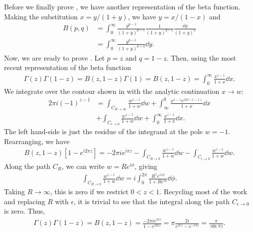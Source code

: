 Before we finally prove , we have another representation of the beta function.
Making the substitution $x = y/(1+y)$, we have $y = x/(1-x)$ and
\begin{align}
    B(p,q) &= \int_{0}^{\infty} \frac{y^{p-1}}{(1+y)^{p-1}} \frac{1}{(1+y)^{q-1}} \frac{\dd{y}}{(1+y)^2} \nonumber \\
           &= \int_{0}^{\infty} \frac{y^{p-1}}{(1+y)^{p+q}} \dd{y}
.\end{align}
Now, we are ready to prove .
Let $p = z$ and $q = 1-z$.
Then, using the most recent representation of the beta function 
\begin{eqnarray}
    \Gamma(z)\Gamma(1-z) = B(z,1-z) \Gamma(1) = B(z,1-z) = \int_{0}^{\infty} \frac{x^{z-1}}{1+x} \dd{x}
.\end{eqnarray}
We integrate over the contour shown in  with the analytic continuation $x \rightarrow w$:
\begin{align}
    \label{eq:beta-contour-integral}
    2 \pi i (-1)^{z-1} &= \int_{C_{R \rightarrow \infty}} \frac{w^{z-1}}{1+w} \dd{w} + \int_{\infty}^{0} \frac{x^{1-z} e^{i 2\pi(z-1)}}{1+x} \dd{x} \nonumber \\
             &+ \int_{C_{\epsilon\rightarrow 0}} \frac{w^{z-1}}{1+w} \dd{w} + \int_{0}^{\infty} \frac{x^{z-1}}{1+x} \dd{x}
.\end{align}
The left hand-side is just the residue of the integrand at the pole $w = -1$.
Rearranging, we have
\begin{align}
    B(z,1-z) [ 1 - e^{i 2 \pi z} ] = -2 \pi i e^{i \pi z} - \int_{C_{R \rightarrow 0}} \frac{w^{z-1}}{1 + w} \dd{w} - \int_{C_{\epsilon \rightarrow 0}} \frac{w^{z-1}}{1 + w} \dd{w}
.\end{align}
Along the path $C_{R}$, we can write $w = R e^{i \phi}$, giving
\begin{eqnarray}
    \int_{C_{R \rightarrow 0}} \frac{w^{z-1}}{1 + w} \dd{w} = i \int_{0}^{2\pi} \frac{R^{z} e^{iz\phi}}{1 + R e^{i\phi}} \dd{\phi}
.\end{eqnarray}
Taking $R \rightarrow \infty$, this is zero if we restrict $0 < z < 1$.
Recycling most of the work and replacing $R$ with $\epsilon$, it is trivial to see that the integral along the path $C_{\epsilon \rightarrow 0}$ is zero.
Thus,
\begin{eqnarray}
    \Gamma(z) \Gamma(1-z) = B(z,1-z) = \frac{-2 \pi i e^{i \pi z}}{1 - e^{i 2 \pi z}} = \pi \frac{2i}{e^{i \pi z} - e^{-i \pi z}} = \frac{\pi}{\sin{\pi z}}
.\end{eqnarray}
